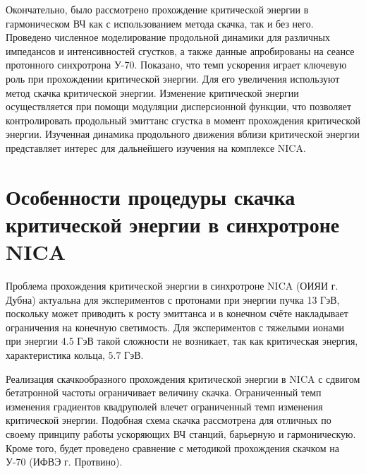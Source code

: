 \par Окончательно, было рассмотрено прохождение критической энергии в гармоническом ВЧ как с использованием метода скачка, так и без него. Проведено численное моделирование продольной динамики для различных импедансов и интенсивностей сгустков, а также данные апробированы на сеансе протонного синхротрона У-70. Показано, что темп ускорения играет ключевую роль при прохождении критической энергии. Для его увеличения используют метод скачка критической энергии. Изменение критической энергии осуществляется при помощи модуляции дисперсионной функции, что позволяет контролировать продольный эмиттанс сгустка в момент прохождения критической энергии. Изученная динамика продольного движения вблизи критической энергии представляет интерес для дальнейшего изучения на комплексе NICA.

\section{Особенности процедуры скачка критической энергии в синхротроне NICA}

\par Проблема прохождения критической энергии в синхротроне NICA (ОИЯИ г. Дубна) актуальна для экспериментов с протонами при энергии пучка 13 ГэВ, поскольку может приводить к росту эмиттанса и в конечном счёте накладывает ограничения на конечную светимость. Для экспериментов с тяжелыми ионами при энергии $4.5$ ГэВ такой сложности не возникает, так как критическая энергия, характеристика кольца, $5.7$ ГэВ. 
\par Реализация скачкообразного прохождения критической энергии в NICA с сдвигом бетатронной частоты ограничивает величину скачка. Ограниченный темп изменения градиентов квадруполей влечет ограниченный темп изменения критической энергии. Подобная схема скачка рассмотрена для отличных по своему принципу работы ускоряющих ВЧ станций, барьерную и гармоническую. Кроме того, будет проведено сравнение с методикой прохождения скачком на У-70 (ИФВЭ г. Протвино).

